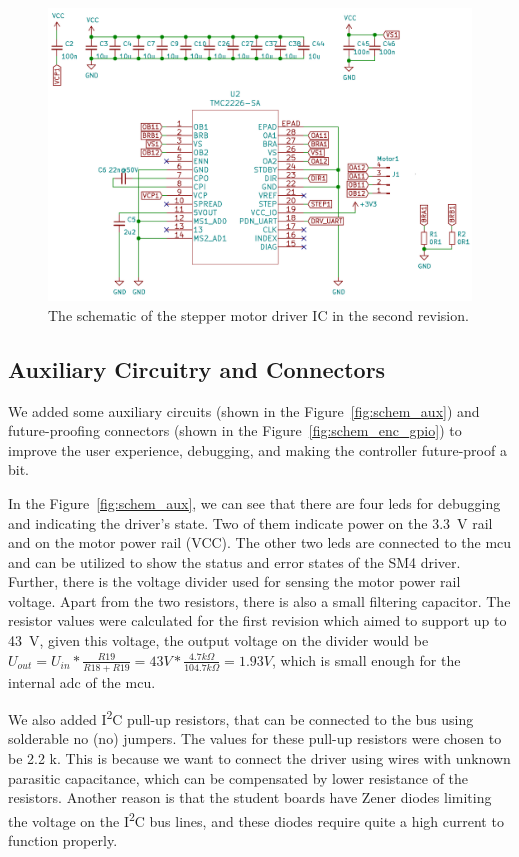 \begin{figure}[H]
    \centering
    \includegraphics[width=\textwidth]{obrazky/schem_driver_rev2}
    \caption{The schematic of the stepper motor driver IC in the second revision.}
    \label{fig:schem_driver2}
\end{figure}

\subsection{Auxiliary Circuitry and Connectors}
\label{subsec:aux_connectors}
We added some auxiliary circuits (shown in the Figure~\ref{fig:schem_aux}) and future-proofing connectors (shown in the Figure~\ref{fig:schem_enc_gpio}) to improve the user experience, debugging, and making the controller future-proof a bit.

In the Figure~\ref{fig:schem_aux}, we can see that there are four \acs{led}s for debugging and indicating the driver's state.
Two of them indicate power on the 3.3~V rail and on the motor power rail (VCC).
The other two \acs{led}s are connected to the \acs{mcu} and can be utilized to show the status and error states of the SM4 driver.
Further, there is the voltage divider used for sensing the motor power rail voltage.
Apart from the two resistors, there is also a small filtering capacitor.
The resistor values were calculated for the first revision which aimed to support up to 43~V, given this voltage, the output voltage on the divider would be $U_{out} = U_{in} * \frac{R19}{R18+R19} = 43 V * \frac{4.7 k\Omega}{104.7 k\Omega} = 1.93 V$, which is small enough for the internal \acs{adc} of the \acs{mcu}.

We also added I\textsuperscript{2}C pull-up resistors, that can be connected to the bus using solderable \acs{no} (\acl{no}) jumpers.
The values for these pull-up resistors were chosen to be 2.2 k\textohm.
This is because we want to connect the driver using wires with unknown parasitic capacitance, which can be compensated by lower resistance of the resistors.
Another reason is that the student boards have Zener diodes limiting the voltage on the I\textsuperscript{2}C bus lines, and these diodes require quite a high current to function properly.

